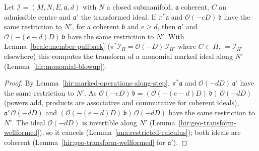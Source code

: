 \begin{lemma}
\label{bcalc:transform-exceptional-factor-along}
\upstreamleanok
Let \(\underline{\mathcal I}=(M,N,E,\mathfrak a,d)\) with \(N\) a closed submanifold, \(\mathfrak a\) coherent, \(C\) an admissible centre and \(\mathfrak a'\) the
transformed ideal. If \(\pi^*\mathfrak a\) and \(\mathcal O(-eD)\,\mathfrak b\) have the same restriction to \(N'\), for a coherent \(\mathfrak b\) and \(e\ge d\),
then \(\mathfrak a'\) and \(\mathcal O(-(e-d)D)\,\mathfrak b\) have the same restriction to \(N'\). With Lemma~\ref{bcalc:member-pullback}
(\(\pi^*\mathcal I_H=\mathcal O(-D)\,\mathcal I_{H'}\) where \(C\subset H\), \(=\mathcal I_{H'}\) elsewhere) this computes the transform of a monomial marked ideal along
\(N'\) (Lemma~\ref{hir:monomial-blowup}).
\end{lemma}
\begin{proof}
\upstreamleanok
By Lemma~\ref{hir:marked-operations-along-step}, \(\pi^*\mathfrak a\) and \(\mathcal O(-dD)\,\mathfrak a'\) have the same restriction to \(N'\). As
\(\mathcal O(-eD)\,\mathfrak b=(\mathcal O(-(e-d)D)\,\mathfrak b)\,\mathcal O(-dD)\) (powers add, products are associative and commutative for coherent ideals),
\(\mathfrak a'\,\mathcal O(-dD)\) and \((\mathcal O(-(e-d)D)\,\mathfrak b)\,\mathcal O(-dD)\) have the same restriction to \(N'\). The ideal \(\mathcal O(-dD)\) is invertible
along \(N'\) (Lemma~\ref{hir:geo-transform-wellformed}), so it cancels (Lemma~\ref{ana:restricted-calculus}); both ideals are coherent
(Lemma~\ref{hir:geo-transform-wellformed} for \(\mathfrak a'\)).
\end{proof}


